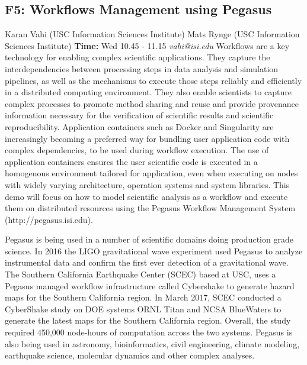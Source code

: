 \documentclass{report}
\begin{document}
\subsection*{F5: Workflows Management using Pegasus}
\bigskip
Karan Vahi (USC Information Sciences Institute) \newline Mats Rynge (USC Information Sciences Institute) \newline   \newline   \newline  \newline  \newline\newline
{\bf Time:} Wed 10.45 - 11.15\newline
\newline
{\it vahi@isi.edu}\newline
\newline\newline
Workflows are a key technology for enabling complex scientific applications. They capture the interdependencies between processing steps in data analysis and simulation pipelines, as well as the mechanisms to execute those steps reliably and efficiently in a distributed computing environment. They also enable scientists to capture complex processes to promote method sharing and reuse and provide provenance information necessary for the verification of scientific results and scientific reproducibility. Application containers such as Docker and Singularity are increasingly becoming a preferred way for bundling user application code with complex dependencies, to be used during workflow execution. The use of application containers ensures the user scientific code is executed in a homogenous environment tailored for application, even when executing on nodes with widely varying architecture, operation systems and system libraries. This demo will focus on how to model scientific analysis as a workflow and execute them on distributed resources using the Pegasus Workflow Management System
(http://pegasus.isi.edu).

Pegasus is being used in a number of scientific domains doing production grade science. In
2016 the LIGO gravitational wave experiment used Pegasus to analyze instrumental data
and confirm the first ever detection of a gravitational wave. The Southern California
Earthquake Center (SCEC) based at USC, uses a Pegasus managed workflow infrastructure
called Cybershake to generate hazard maps for the Southern California region. In March
2017, SCEC conducted a CyberShake study on DOE systems ORNL Titan and NCSA
BlueWaters to generate the latest maps for the Southern California region. Overall, the study
required 450,000 node-hours of computation across the two systems. Pegasus is also being
used in astronomy, bioinformatics, civil engineering, climate modeling, earthquake science,
molecular dynamics and other complex analyses.
\end{document}
